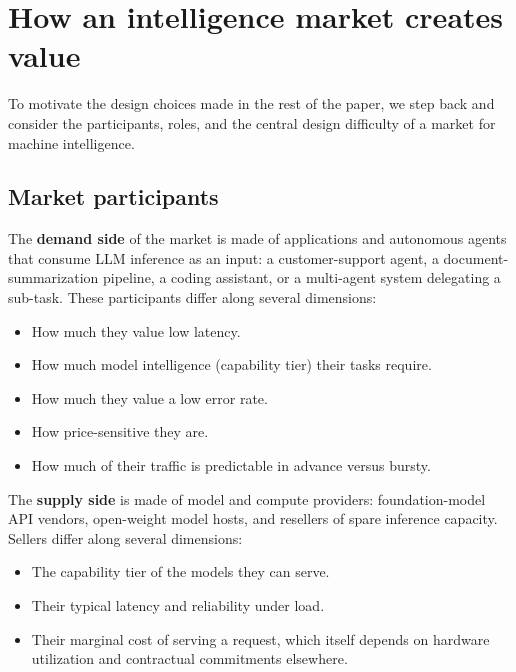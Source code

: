 \section{How an intelligence market creates value}
\label{sec:market_design}

To motivate the design choices made in the rest of the paper, we step back
and consider the participants, roles, and the central design difficulty of
a market for machine intelligence.

\subsection{Market participants}
\label{sec:market_participants}

The \textbf{demand side} of the market is made of applications and autonomous agents
that consume LLM inference as an input: a customer-support agent, a
document-summarization pipeline, a coding assistant, or a multi-agent system
delegating a sub-task. These participants differ along several dimensions:

\begin{itemize}
  \item How much they value low latency.
  \item How much model intelligence (capability tier) their tasks require.
  \item How much they value a low error rate.
  \item How price-sensitive they are.
  \item How much of their traffic is predictable in advance versus bursty.
\end{itemize}

The \textbf{supply side} is made of model and compute providers: foundation-model
API vendors, open-weight model hosts, and resellers of spare inference
capacity. Sellers differ along several dimensions:

\begin{itemize}
  \item The capability tier of the models they can serve.
  \item Their typical latency and reliability under load.
  \item Their marginal cost of serving a request, which itself depends on
    hardware utilization and contractual commitments elsewhere.
\end{itemize}

